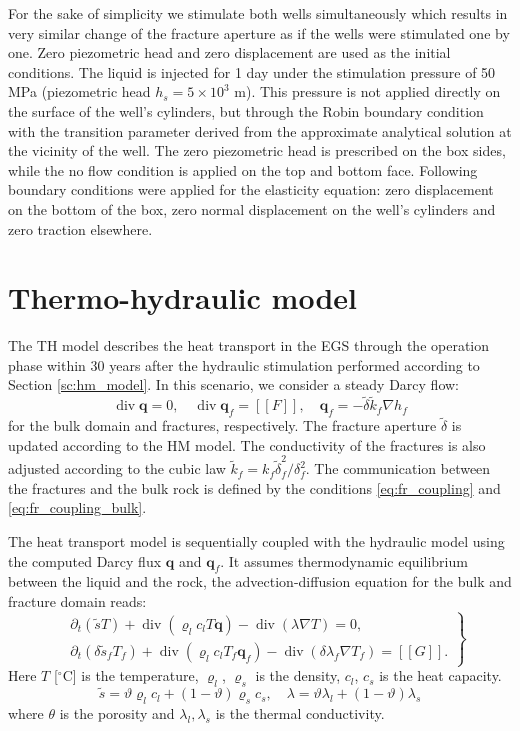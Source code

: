 \documentclass{article}
\renewcommand{\div}{\operatorname{div}}
\newcommand{\eq}[1]{\begin{equation}#1\end{equation}}
\newcommand{\jmp}[1]{[\![#1]\!]}
\newcommand{\vc}[1]{\boldsymbol{#1}}
\newcommand{\degC}{$^\circ\mathrm{C}$}
\begin{document}
For the sake of simplicity we stimulate both wells simultaneously which results in very similar change of the fracture aperture as if the wells were stimulated one by one. Zero piezometric head and zero displacement are used as the initial conditions. The liquid is injected for 1 day under the stimulation pressure of 50 MPa (piezometric head $h_s=5\times10^3$ m). This pressure is not applied directly on the surface of the well's cylinders, but through the Robin boundary condition with the transition parameter derived from the approximate analytical solution at the vicinity of the well. The zero piezometric head is prescribed on the box sides, while the no flow condition is applied on the top and bottom face. Following boundary conditions were applied for the elasticity equation: zero displacement on the bottom of the box, zero normal displacement on the well's cylinders and zero traction elsewhere.

\section{Thermo-hydraulic model}
The TH model describes the heat transport in the EGS through the operation phase within 30 years after the hydraulic stimulation performed according to Section \ref{sc:hm_model}. In this scenario, we consider a steady Darcy flow: 
\eq{ \label{th_darcy}
    \div \vc q = 0, \quad \div  \vc q_f =  \jmp F,\quad
    \vc q_f = -\tilde\delta \tilde k_f \nabla h_f
}
for the bulk domain and fractures, respectively. The fracture aperture $\tilde \delta$ is updated according to the HM model.
The conductivity of the fractures is also adjusted according to the cubic law $\tilde k_f = k_f\tilde\delta_f^2 / \delta_f^2$.
The communication between the fractures and the bulk rock is defined by the conditions \eqref{eq:fr_coupling} and \eqref{eq:fr_coupling_bulk}.

The heat transport model is sequentially coupled with the hydraulic model using the computed Darcy flux $\vc q$ and $\vc q_f$. It assumes thermodynamic equilibrium between the liquid and the rock, the advection-diffusion equation for the bulk and fracture domain reads:
\eq{
\left.\begin{aligned}
&\partial_t\left(\tilde s T \right) + \div(\varrho_l c_l T \vc q) - \div(\lambda\nabla T) = 0,\\
&\partial_t\left(\delta \tilde s_f T_f \right) + \div(\varrho_l c_l T_f \vc q_f) - \div(\delta\lambda_f\nabla T_f) = \jmp{G}.
\end{aligned}\right\}
}
Here $T$ [\degC] is the temperature, $\varrho_l$, $\varrho_s$ is the density, $c_l$, $c_s$ is the heat capacity.
\eq{
\tilde s = \vartheta \varrho_l c_l + (1-\vartheta)\varrho_s c_s,\quad 
\lambda= \vartheta \lambda_l + (1-\vartheta)\lambda_s
}
where $\theta$ is the porosity and $\lambda_l,\lambda_s$ is the thermal conductivity.
\end{document}
